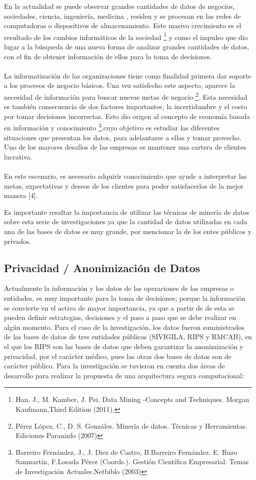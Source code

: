 \documentclass[a4paper,openright,12pt]{book}
\theoremstyle{definition}
\theoremstyle{remark}
\begin{document}
En la actualidad se puede observar grandes cantidades de datos de negocios, sociedades, ciencia, ingeniería, medicina , residen y se procesan en las redes de computadoras o dispositivos de almacenamiento. Este masivo crecimiento es el resultado de los cambios informáticos de la sociedad \footnote{Han, J., M. Kamber, J. Pei. Data Mining -Concepts and Techniques. Morgan Kaufmann,Third Edition (2011).} y como el impulso que dio lugar a la búsqueda de una nueva forma de analizar grandes cantidades de datos, con el fin de obtener información de ellos para la toma de decisiones.\\\\La informatización de las organizaciones tiene como finalidad primera dar soporte a los procesos de negocio básicos. Una vez satisfecho este aspecto, aparece la necesidad de información para buscar nuevas metas de negocio \footnote{Pérez López, C., D. S. Gonzáles. Minería de datos. Técnicas y Herramientas. Ediciones Paraninfo (2007)}.
Esta necesidad es también consecuencia de dos factores importantes, la incertidumbre y el costo por tomar decisiones incorrectas. Esto dio origen al concepto de economía basada en información y conocimiento \footnote{Barreiro Fernández, J., J. Diez de Castro, B.Barreiro Fernández. E. Ruzo Sanmartín, F.Losada Pérez (Coords.). Gestión Científica Empresarial: Temas de Investigación Actuales.Netbiblo (2003)},cuyo objetivo es estudiar las diferentes situaciones que presentan los datos, para adelantarse a ellas y tomar provecho. Uno de los mayores desafíos de las empresas es mantener una cartera de clientes lucrativa. \\\\En este escenario, es necesario adquirir conocimiento que ayude a interpretar las metas, expectativas y deseos de los clientes para poder satisfacerlos de la mejor manera [4].

Es importante resaltar la importancia de utilizar las técnicas de minería  de datos sobre esta serie de investigaciones ya que la cantidad de datos utilizadas en cada una de las bases de datos es muy grande, por mencionar la de los entes públicos y privados.

	\subsection{Privacidad / Anonimización de Datos}
Actualmente la información y los datos de las operaciones de las empresas o entidades, es muy importante para la toma de decisiones; porque la información se convierte en el activo de mayor importancia, ya que a partir de de esta se pueden definir estrategias, decisiones y el paso a paso que se debe realizar en algún momento. Para el caso de la investigación, los datos fueron suministrados de las bases de datos de tres entidades públicas (SIVIGILA, RIPS y RMCAB), en el que los RIPS son las bases de datos que deben garantizar la anonimización y privacidad, por el carácter médico, pues las otras dos bases de datos son de carácter público. Para la investigación se tuvieron en cuenta dos áreas de desarrollo para realizar la propuesta de una arquitectura segura computacional:
\end{document}
